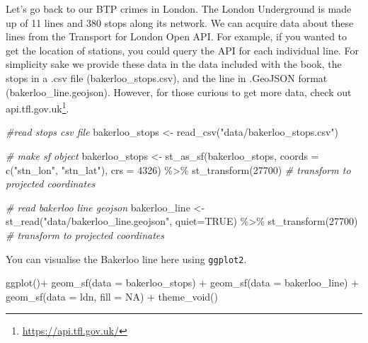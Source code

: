 \documentclass[
  krantz2]{krantz}
\makeatletter
\newenvironment{Shaded}{\begin{snugshade}}{\end{snugshade}}
\newcommand{\AttributeTok}[1]{\textcolor[rgb]{0.61,0.61,0.61}{#1}}
\newcommand{\CommentTok}[1]{\textcolor[rgb]{0.37,0.37,0.37}{\textit{#1}}}
\newcommand{\ConstantTok}[1]{\textcolor[rgb]{0,0,0}{#1}}
\newcommand{\DecValTok}[1]{\textcolor[rgb]{0.06,0.06,0.06}{#1}}
\newcommand{\FunctionTok}[1]{\textcolor[rgb]{0,0,0}{#1}}
\newcommand{\NormalTok}[1]{#1}
\newcommand{\OtherTok}[1]{\textcolor[rgb]{0.37,0.37,0.37}{#1}}
\newcommand{\SpecialCharTok}[1]{\textcolor[rgb]{0,0,0}{#1}}
\newcommand{\StringTok}[1]{\textcolor[rgb]{0.5,0.5,0.5}{#1}}
\renewcommand{\href}[2]{#2\footnote{\url{#1}}}
\newenvironment{kframe}{%
\medskip{}
\setlength{\fboxsep}{.8em}
 \def\at@end@of@kframe{}%
 \ifinner\ifhmode%
  \def\at@end@of@kframe{\end{minipage}}%
  \begin{minipage}{\columnwidth}%
 \fi\fi%
 \def\FrameCommand##1{\hskip\@totalleftmargin \hskip-\fboxsep
 \colorbox{shadecolor}{##1}\hskip-\fboxsep
     \hskip-\linewidth \hskip-\@totalleftmargin \hskip\columnwidth}%
 \MakeFramed {\advance\hsize-\width
   \@totalleftmargin\z@ \linewidth\hsize
   \@setminipage}}%
 {\par\unskip\endMakeFramed%
 \at@end@of@kframe}
\renewenvironment{Shaded}{\begin{kframe}}{\end{kframe}}
\makeatother
\begin{document}
Let's go back to our BTP crimes in London. The London Underground is made up of 11 lines and 380 stops along its network. We can acquire data about these lines from the Transport for London Open API. For example, if you wanted to get the location of stations, you could query the API for each individual line. For simplicity sake we provide these data in the data included with the book, the stops in a .csv file (bakerloo\_stops.csv), and the line in .GeoJSON format (bakerloo\_line.geojson). However, for those curious to get more data, check out \href{https://api.tfl.gov.uk/}{api.tfl.gov.uk}.

\begin{Shaded}
\begin{Highlighting}[]
\CommentTok{\#read stops csv file}
\NormalTok{bakerloo\_stops }\OtherTok{\textless{}{-}} \FunctionTok{read\_csv}\NormalTok{(}\StringTok{"data/bakerloo\_stops.csv"}\NormalTok{)}

\CommentTok{\# make sf object}
\NormalTok{bakerloo\_stops }\OtherTok{\textless{}{-}} \FunctionTok{st\_as\_sf}\NormalTok{(bakerloo\_stops, }
                           \AttributeTok{coords =} \FunctionTok{c}\NormalTok{(}\StringTok{"stn\_lon"}\NormalTok{, }\StringTok{"stn\_lat"}\NormalTok{), }
                           \AttributeTok{crs =} \DecValTok{4326}\NormalTok{) }\SpecialCharTok{\%\textgreater{}\%} 
  \FunctionTok{st\_transform}\NormalTok{(}\DecValTok{27700}\NormalTok{) }\CommentTok{\# transform to projected coordinates}

\CommentTok{\# read bakerloo line geojson}
\NormalTok{bakerloo\_line }\OtherTok{\textless{}{-}} \FunctionTok{st\_read}\NormalTok{(}\StringTok{"data/bakerloo\_line.geojson"}\NormalTok{, }
                         \AttributeTok{quiet=}\ConstantTok{TRUE}\NormalTok{) }\SpecialCharTok{\%\textgreater{}\%} 
  \FunctionTok{st\_transform}\NormalTok{(}\DecValTok{27700}\NormalTok{) }\CommentTok{\# transform to projected coordinates}
\end{Highlighting}
\end{Shaded}

You can visualise the Bakerloo line here using \texttt{ggplot2}.

\begin{Shaded}
\begin{Highlighting}[]
\FunctionTok{ggplot}\NormalTok{()}\SpecialCharTok{+} 
  \FunctionTok{geom\_sf}\NormalTok{(}\AttributeTok{data =}\NormalTok{ bakerloo\_stops) }\SpecialCharTok{+} 
  \FunctionTok{geom\_sf}\NormalTok{(}\AttributeTok{data =}\NormalTok{ bakerloo\_line) }\SpecialCharTok{+} 
  \FunctionTok{geom\_sf}\NormalTok{(}\AttributeTok{data =}\NormalTok{ ldn, }\AttributeTok{fill =} \ConstantTok{NA}\NormalTok{) }\SpecialCharTok{+} 
  \FunctionTok{theme\_void}\NormalTok{() }
\end{Highlighting}
\end{Shaded}
\end{document}

